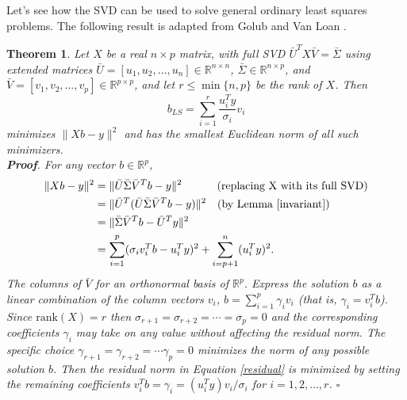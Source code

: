 \documentclass[10pt]{article} %
\newtheorem{thm}{Theorem}
\newcommand{\R}{{\mathbb R}}
\begin{document}
Let's see how the SVD can be used to solve general ordinary least squares
problems. The following result is adapted from Golub and Van Loan
\cite[Theorem 5.5.1]{gvl}.
\begin{thm}
Let $X$ be a real $n\times p$ matrix, with full SVD
$\bar{U}^TX\bar{V} = \bar{\Sigma}$ using extended matrices
$\bar{U} = [u_1, u_2, \ldots, u_n] \in\R^{n\times n}$,
$\bar{\Sigma}\in\R^{n\times p}$, and
$\bar{V} = [v_1, v_2, \ldots, v_p]\in\R^{p\times p}$,
and let $r \le \min\{n, p\}$ be the rank of $X$. Then
\begin{equation}\label{SVDLS}
b_{LS} = \sum_{i=1}^r \frac{u_i^T y}{\sigma_i}v_i
\end{equation}
minimizes $\|X b - y\|^2$ and has the smallest Euclidean norm of all
such minimizers.
\\
{\bf Proof}. For any vector $b\in\R^p$, 
\begin{align}
\|X b - y\|^2 &= \|\bar{U}\bar{\Sigma}\bar{V}^T b - y\|^2 \qquad\,\,\,\,\,\,\, (\mbox{replacing X with its full SVD})\nonumber\\
&= \|\bar{U}^T(\bar{U}\bar{\Sigma}\bar{V}^T b - y)\|^2 \,\,\,\,\,\, (\mbox{by Lemma \ref{invariant}})\nonumber\\
&= \|\bar{\Sigma}\bar{V}^T b - \bar{U}^Ty\|^2 \nonumber \\
&= \sum_{i=1}^p(\sigma_iv_i^T b - u_i^Ty)^2 + \sum_{i=p + 1}^n(u_i^Ty)^2. \label{residual}
\end{align}
The columns of $\bar{V}$ for an orthonormal basis of $\R^p$.
Express the solution $b$ as a linear combination of the column vectors $v_i$,
$b = \sum_{i=1}^p \gamma_i v_i$ (that is, $\gamma_i = v_i^Tb$).
Since $\mathrm{rank}(X)=r$ then
$\sigma_{r+1} = \sigma_{r+2} = \cdots = \sigma_p = 0$ and the corresponding
coefficients $\gamma_i$ may take on any value without affecting the
residual norm.  The specific choice
$\gamma_{r+1} = \gamma_{r+2} = \cdots \gamma_p = 0$
minimizes the norm of any possible solution $b$.
Then the residual norm in Equation \ref{residual} is minimized by setting
the remaining coefficients
$v_i^Tb = \gamma_i = (u_i^T y) v_i/ \sigma_i$ for $i=1, 2, \ldots, r$.
$\square$
\end{thm}
\end{document}
